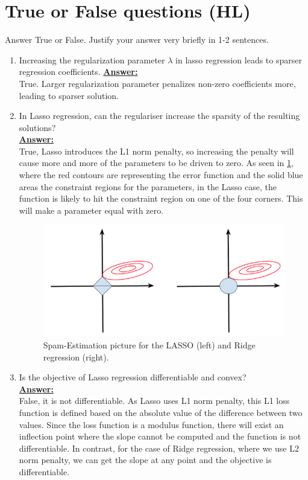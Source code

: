 \documentclass{article}
\newenvironment{qparts}{\begin{enumerate}[1.]}{\end{enumerate}}
\begin{document}
\section{True or False questions (HL)}
Answer True or False. Justify your answer very briefly in 1-2 sentences.
\begin{qparts}
\item Increasing the regularization parameter $\lambda$ in lasso regression leads to sparser regression coefficients.
\underline{\textbf{Answer:}}\\
True. Larger regularization parameter penalizes non-zero coefficients more, leading to
sparser solution.

\item In Lasso regression, can the regulariser increase the sparsity of the resulting solutions?\\
\underline{\textbf{Answer:}}\\
True, Lasso introduces the L1 norm penalty, so increasing the penalty will cause more and more of the parameters to be driven to zero. As seen in \cref{fig:hl2}, where the red contours are representing the error function and the solid blue areas the constraint regions for the parameters, in the Lasso case, the function is likely to hit the constraint region on one of the four corners. This will make a parameter equal with zero.
\begin{figure}[!htb]
    \centering
    \includegraphics[width=.6\textwidth]{fig/fig-han-4.PNG}
    \caption{Spam-Estimation picture for the LASSO (left) and Ridge regression (right).}
    \label{fig:hl2}
\end{figure}

\item Is the objective of Lasso regression differentiable and convex?\\
\underline{\textbf{Answer:}}\\
False, it is not differentiable. As Lasso uses L1 norm penalty, this L1 loss function is defined based on the absolute value of the difference between two values. Since the loss function is a modulus function, there will exist an inflection point where the slope cannot be computed and the function is not differentiable. In contrast, for the case of Ridge regression, where we use L2 norm penalty, we can get the slope at any point and the objective is differentiable.


\end{qparts}
\end{document}
